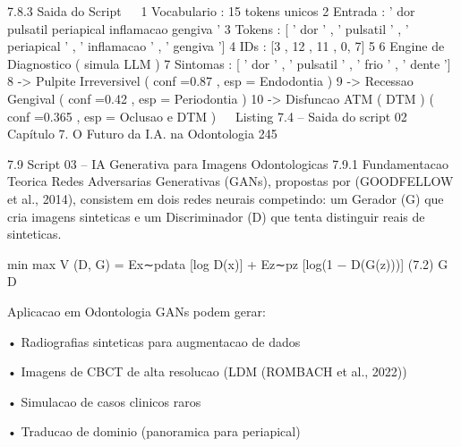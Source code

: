      7.8.3      Saida do Script
                                                                                                   
 1       Vocabulario : 15 tokens unicos
 2       Entrada : ' dor pulsatil periapical inflamacao gengiva '
 3       Tokens : [ ' dor ' , ' pulsatil ' , ' periapical ' , ' inflamacao ' , ' gengiva ']
 4       IDs : [3 , 12 , 11 , 0, 7]
 5
 6       Engine de Diagnostico ( simula LLM )
 7       Sintomas : [ ' dor ' , ' pulsatil ' , ' frio ' , ' dente ']
 8         -> Pulpite Irreversivel ( conf =0.87 , esp = Endodontia )
 9         -> Recessao Gengival ( conf =0.42 , esp = Periodontia )
10         -> Disfuncao ATM ( DTM ) ( conf =0.365 , esp = Oclusao e DTM )
                                                                                                   
                                      Listing 7.4 – Saida do script 02
    Capítulo 7. O Futuro da I.A. na Odontologia                                                    245


    7.9      Script 03 – IA Generativa para Imagens Odontologicas
    7.9.1     Fundamentacao Teorica
    Redes Adversarias Generativas (GANs), propostas por (GOODFELLOW et al., 2014),
    consistem em dois redes neurais competindo: um Gerador (G) que cria imagens
    sinteticas e um Discriminador (D) que tenta distinguir reais de sinteticas.


                  min max V (D, G) = Ex∼pdata [log D(x)] + Ez∼pz [log(1 − D(G(z)))]               (7.2)
                   G     D



        Aplicacao em Odontologia GANs podem gerar:

            • Radiografias sinteticas para augmentacao de dados

            • Imagens de CBCT de alta resolucao (LDM (ROMBACH et al., 2022))

            • Simulacao de casos clinicos raros

            • Traducao de dominio (panoramica para periapical)


